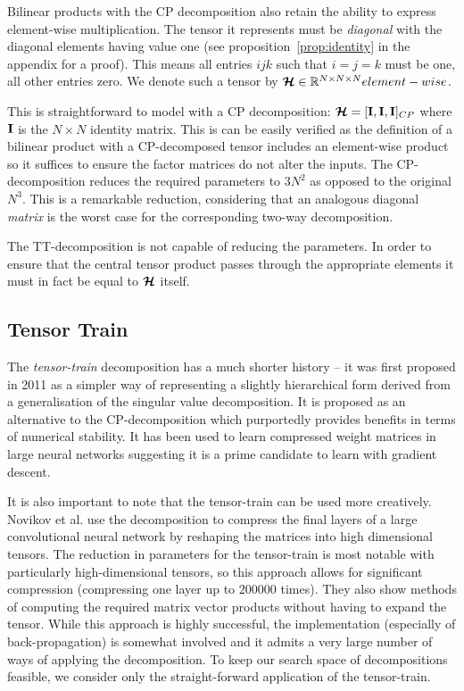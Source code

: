Bilinear products with the CP decomposition also retain the ability to express element-wise
multiplication. The tensor it represents must be \textit{diagonal} with the
 diagonal elements having value one
 (see proposition~\ref{prop:identity} in the appendix for a proof). This means all entries
\(ijk\) such that \(i = j = k\) must be one, all other entries zero. We denote such a tensor
by \(\bm{\mathcal{H}} \in \mathbb{R}^{N \times N \times N}element-wise\).

This is straightforward to model with a CP decomposition:
\(\bm{\mathcal{H}} = [\mathbf{I}, \mathbf{I}, \mathbf{I}]_{CP}\) where \(\mathbf{I}\) is the 
\(N\times N\) identity matrix. This is can be easily verified as the definition of a bilinear
product with a CP-decomposed tensor includes an element-wise product so it suffices to ensure the
factor matrices do not alter the inputs. The CP-decomposition reduces the required parameters
to \(3N^2\) as opposed to the original \(N^3\). This is a remarkable reduction, considering that
an analogous diagonal \emph{matrix} is the worst case for the corresponding two-way 
decomposition. 

The TT-decomposition is not capable of reducing the parameters. In order to ensure that the
central tensor product passes through the appropriate elements it must in
fact be equal to \(\bm{\mathcal{H}}\) itself.


\subsection{Tensor Train} %
The \emph{tensor-train} decomposition has a much shorter history -- it was first proposed in
2011 as a simpler way of representing a slightly hierarchical form derived from a
generalisation of the singular value decomposition. \autocite{Osedelets2011} It is proposed
as an alternative to the CP-decomposition which purportedly provides benefits in terms of
numerical stability. It has been used to learn compressed weight matrices in large neural
networks \autocite{Novikov} suggesting it is a prime candidate to learn with gradient descent.

It is also important to note that the tensor-train can be used more creatively. 
Novikov et al. \autocite{Novikov} use the decomposition to compress the final layers of a 
large convolutional neural
network by reshaping the matrices into high dimensional tensors. The reduction in parameters for
the tensor-train is most notable with particularly high-dimensional tensors, so this approach allows
for significant compression (compressing one layer up to \(200000\) times).
They also show methods of computing the required matrix vector products
without having to expand the tensor. While this approach is highly successful, the implementation
(especially of back-propagation) is somewhat involved and it admits a very large number of ways of
applying the decomposition. To keep our search space of decompositions feasible, we consider only
the straight-forward application of the tensor-train.

